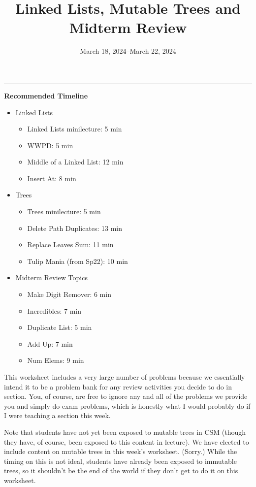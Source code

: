 \documentclass{exam}
\title{Linked Lists, Mutable Trees and Midterm Review}
\date{March 18, 2024--March 22, 2024}
\begin{document}
\maketitle
\rule{\textwidth}{0.15em}

\begin{meta}
    \textbf{Recommended Timeline}
    \begin{itemize}
        \item Linked Lists
        \begin{itemize}
            \item Linked Lists minilecture: 5 min
            \item WWPD: 5 min
            \item Middle of a Linked List: 12 min
            \item Insert At: 8 min
        \end{itemize}
        \item Trees
        \begin{itemize}
            \item Trees minilecture: 5 min
            \item Delete Path Duplicates: 13 min
            \item Replace Leaves Sum: 11 min
            \item Tulip Mania (from Sp22): 10 min
        \end{itemize}
        \item Midterm Review Topics
        \begin{itemize}
            \item Make Digit Remover: 6 min
            \item Incredibles: 7 min
            \item Duplicate List: 5 min
            \item Add Up: 7 min
            \item Num Elems: 9 min
        \end{itemize}
    \end{itemize}
    This worksheet includes a very large number of problems because we essentially intend it to be a problem bank for any review activities you decide to do in section. You, of course, are free to ignore any and all of the problems we provide you and simply do exam problems, which is honestly what I would probably do if I were teaching a section this week. 

    Note that students have not yet been exposed to mutable trees in CSM (though they have, of course, been exposed to this content in lecture). We have elected to include content on mutable trees in this week's worksheet. (Sorry.) While the timing on this is not ideal, students have already been exposed to immutable trees, so it shouldn't be the end of the world if they don't get to do it on this worksheet.


\end{meta}
\end{document}
